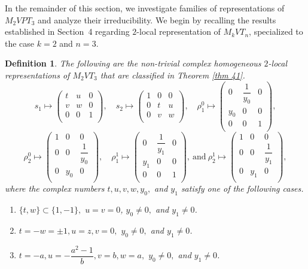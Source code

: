 \documentclass[preprint]{elsarticle}
\newtheorem{definition}[theorem]{Definition}
\begin{document}
In the remainder of this section, we investigate families of representations of $M_2VPT_3$ and analyze their irreducibility. We begin by recalling the results established in Section~4 regarding $2$-local representation of $M_kVT_n$, specialized to the case $k = 2$ and $n = 3$. 

\begin{definition}  \label{thm 51}
The following are the non-trivial complex homogeneous  $2$-local representations of $M_2VT_3$ that are classified in Theorem \ref{thm 41}.
$$s_1\mapsto \left(
\begin{array}{ccc}
 t & u & 0 \\
 v & w & 0 \\
 0 & 0 & 1 \\
\end{array}
\right),\quad 
s_2\mapsto \left(
\begin{array}{ccc}
 1 & 0 & 0 \\
 0 & t & u \\
 0 & v & w \\
\end{array}
\right),\quad 
\rho^0_1\mapsto \left(
\begin{array}{ccc}
 0 & \dfrac{1}{y_0} & 0 \\
 y_0 & 0 & 0 \\
 0 & 0 & 1 \\
\end{array}
\right),$$
$$\rho^0_2\mapsto 
\left(
\begin{array}{ccc}
 1 & 0 & 0 \\
 0 & 0 & \dfrac{1}{y_0} \\
 0 & y_0 & 0 \\
\end{array}
\right), \quad
\rho^1_1\mapsto 
\left(
\begin{array}{ccc}
 0 & \dfrac{1}{y_1} & 0 \\
 y_1 & 0 & 0 \\
 0 & 0 & 1 \\
\end{array}
\right),~\text{and}~
\rho^1_2\mapsto
\left(
\begin{array}{ccc}
 1 & 0 & 0 \\
 0 & 0 & \dfrac{1}{y_1} \\
 0 & y_1 & 0 \\
\end{array}
\right),$$
where the complex numbers $t,u,v,w,y_0,$ and $y_1$ satisfy one of the following cases.
\begin{enumerate}
    \item $\{t,w\}\subset\{1,-1\},$ $u=v=0$, $y_0\neq0,$ and $y_1\neq0$.
    \item $t=-w=\pm 1, u=z , v=0,$ $y_0\neq0,$ and $y_1\neq0$.
    \item $t=-a, u=-\dfrac{a^2-1}{b}, v=b, w=a,$ $y_0\neq0,$ and $y_1\neq0$.
\end{enumerate}
\end{definition}
\end{document}
